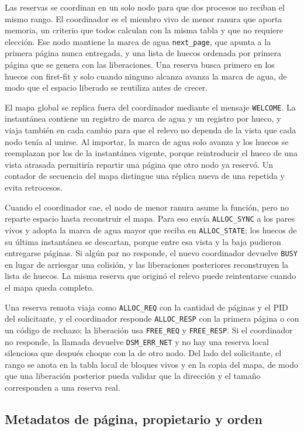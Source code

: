 Las reservas se coordinan en un solo nodo para que dos procesos no reciban el mismo rango. El coordinador es el miembro vivo de menor ranura que aporta memoria, un criterio que todos calculan con la misma tabla y que no requiere elección. Ese nodo mantiene la marca de agua \texttt{next\_page}, que apunta a la primera página nunca entregada, y una lista de huecos ordenada por primera página que se genera con las liberaciones. Una reserva busca primero en los huecos con first-fit y solo cuando ninguno alcanza avanza la marca de agua, de modo que el espacio liberado se reutiliza antes de crecer.

El mapa global se replica fuera del coordinador mediante el mensaje \texttt{WELCOME}. La instantánea contiene un registro de marca de agua y un registro por hueco, y viaja también en cada cambio para que el relevo no dependa de la vista que cada nodo tenía al unirse. Al importar, la marca de agua solo avanza y los huecos se reemplazan por los de la instantánea vigente, porque reintroducir el hueco de una vista atrasada permitiría repartir una página que otro nodo ya reservó. Un contador de secuencia del mapa distingue una réplica nueva de una repetida y evita retrocesos.

Cuando el coordinador cae, el nodo de menor ranura asume la función, pero no reparte espacio hasta reconstruir el mapa. Para eso envía \texttt{ALLOC\_SYNC} a los pares vivos y adopta la marca de agua mayor que reciba en \texttt{ALLOC\_STATE}; los huecos de su última instantánea se descartan, porque entre esa vista y la baja pudieron entregarse páginas. Si algún par no responde, el nuevo coordinador devuelve \texttt{BUSY} en lugar de arriesgar una colisión, y las liberaciones posteriores reconstruyen la lista de huecos. La misma reserva que originó el relevo puede reintentarse cuando el mapa queda completo.

Una reserva remota viaja como \texttt{ALLOC\_REQ} con la cantidad de páginas y el PID del solicitante, y el coordinador responde \texttt{ALLOC\_RESP} con la primera página o con un código de rechazo; la liberación usa \texttt{FREE\_REQ} y \texttt{FREE\_RESP}. Si el coordinador no responde, la llamada devuelve \texttt{DSM\_ERR\_NET} y no hay una reserva local silenciosa que después choque con la de otro nodo. Del lado del solicitante, el rango se anota en la tabla local de bloques vivos y en la copia del mapa, de modo que una liberación posterior pueda validar que la dirección y el tamaño corresponden a una reserva real.

\subsection{Metadatos de página, propietario y orden}\label{sec:metadatos-pagina}

